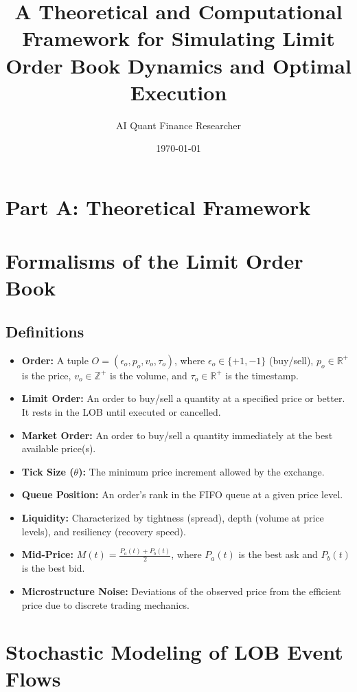 \documentclass{article}
\title{A Theoretical and Computational Framework for Simulating Limit Order Book Dynamics and Optimal Execution}
\author{AI Quant Finance Researcher}
\date{\today}
\begin{document}
\maketitle

\section*{Part A: Theoretical Framework}

\section{Formalisms of the Limit Order Book}

\subsection{Definitions}

\begin{itemize}
    \item \textbf{Order:} A tuple $O = (\epsilon_o, p_o, v_o, \tau_o)$, where $\epsilon_o \in \{+1, -1\}$ (buy/sell), $p_o \in \mathbb{R}^+$ is the price, $v_o \in \mathbb{Z}^+$ is the volume, and $\tau_o \in \mathbb{R}^+$ is the timestamp.
    \item \textbf{Limit Order:} An order to buy/sell a quantity at a specified price or better. It rests in the LOB until executed or cancelled.
    \item \textbf{Market Order:} An order to buy/sell a quantity immediately at the best available price(s).
    \item \textbf{Tick Size ($\theta$):} The minimum price increment allowed by the exchange.
    \item \textbf{Queue Position:} An order's rank in the FIFO queue at a given price level.
    \item \textbf{Liquidity:} Characterized by tightness (spread), depth (volume at price levels), and resiliency (recovery speed).
    \item \textbf{Mid-Price:} $M(t) = \frac{P_a(t) + P_b(t)}{2}$, where $P_a(t)$ is the best ask and $P_b(t)$ is the best bid.
    \item \textbf{Microstructure Noise:} Deviations of the observed price from the efficient price due to discrete trading mechanics.
\end{itemize}

\section{Stochastic Modeling of LOB Event Flows}
\end{document}
